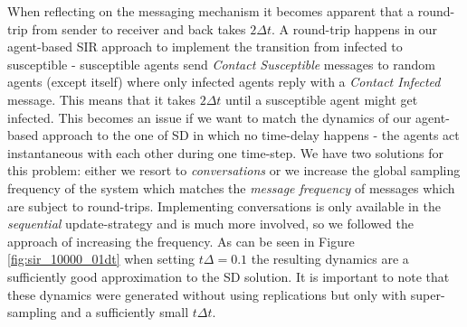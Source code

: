 When reflecting on the messaging mechanism it becomes apparent that a round-trip from sender to receiver and back takes $2 \Delta t$. A round-trip happens in our agent-based SIR approach to implement the transition from infected to susceptible - susceptible agents send \textit{Contact Susceptible} messages to random agents (except itself) where only infected agents reply with a \textit{Contact Infected} message. This means that it takes $2 \Delta t$ until a susceptible agent might get infected. This becomes an issue if we want to match the dynamics of our agent-based approach to the one of SD in which no time-delay happens - the agents act instantaneous with each other during one time-step. 
We have two solutions for this problem: either we resort to \textit{conversations} or we increase the global sampling frequency of the system which matches the \textit{message frequency} of messages which are subject to round-trips. Implementing conversations is only available in the \textit{sequential} update-strategy and is much more involved, so we followed the approach of increasing the frequency. As can be seen in Figure \ref{fig:sir_10000_01dt} when setting $t\Delta = 0.1$ the resulting dynamics are a sufficiently good approximation to the SD solution. It is important to note that these dynamics were generated without using replications but only with super-sampling and a sufficiently small $t\Delta t$.